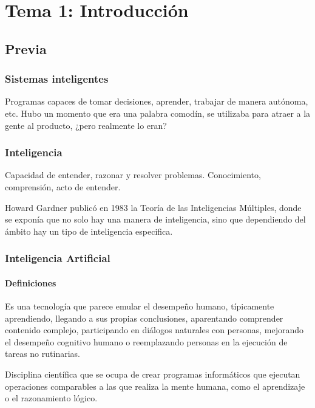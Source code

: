 \documentclass[12pt, twoside, openright]{report} %
\begin{document}
\chapter{Tema 1: Introducción}
\section{Previa}
\subsection{Sistemas inteligentes}
Programas capaces de tomar decisiones, aprender, trabajar de manera autónoma, etc. Hubo un momento que era una palabra comodín, se utilizaba para atraer a la gente al producto, ¿pero realmente lo eran?

\subsection{Inteligencia}
Capacidad de entender, razonar y resolver problemas. Conocimiento, comprensión, acto de entender.

Howard Gardner publicó en 1983 la Teoría de las Inteligencias Múltiples, donde se exponía que no solo hay una manera de inteligencia, sino que dependiendo del ámbito hay un tipo de inteligencia especifica.
\begin{figure}[H]
	{\def\svgwidth{.8\textwidth}
		}
\end{figure}

\subsection{Inteligencia Artificial}
\subsubsection{Definiciones}
Es una tecnología que parece emular el desempeño humano, típicamente aprendiendo, llegando a sus propias conclusiones, aparentando comprender contenido complejo, participando en diálogos naturales con personas, mejorando el desempeño  cognitivo humano o reemplazando personas en la ejecución de tareas no rutinarias.

Disciplina científica que se ocupa de crear programas informáticos que ejecutan operaciones comparables a las que realiza la mente humana, como el aprendizaje o el razonamiento lógico.
\end{document}
